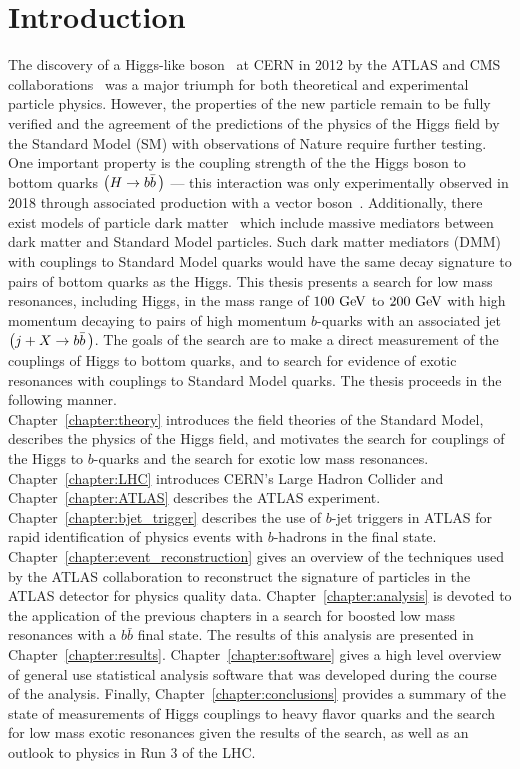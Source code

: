 \chapter{Introduction}\label{chapter:introduction}

The discovery of a Higgs-like boson~\cite{Higgs:1964ia,Higgs:1964pj,Higgs:1966ev,Englert:1964et,Guralnik:1964eu} at CERN in 2012 by the \Gls{ATLAS} and CMS collaborations~\cite{Aad:2012tfa,Chatrchyan:2012xdj} was a major triumph for both theoretical and experimental particle physics.
However, the properties of the new particle remain to be fully verified and the agreement of the predictions of the physics of the Higgs field by the \Gls{Standard Model} (SM) with observations of Nature require further testing.
One important property is the coupling strength of the the Higgs boson to bottom quarks $\left(H \to b\bar{b}\,\right)$ --- this interaction was only experimentally observed in 2018 through associated production with a vector boson~\cite{Aaboud:2018zhk,CMS:2018abb}.
Additionally, there exist models of particle dark matter~\cite{Abdallah:2015ter} which include massive mediators between dark matter and Standard Model particles.
Such \gls{dark matter mediator}s (DMM) with couplings to Standard Model quarks would have the same decay signature to pairs of bottom quarks as the Higgs.
This thesis presents a search for low mass resonances, including Higgs, in the mass range of $100~\mathrm{GeV}$ to $200~\mathrm{GeV}$ with high momentum decaying to pairs of high momentum $b$-quarks with an associated jet $\left(j + X \to b\bar{b}\,\right)$.
The goals of the search are to make a direct measurement of the couplings of Higgs to bottom quarks, and to search for evidence of exotic resonances with couplings to Standard Model quarks.
The thesis proceeds in the following manner.\\

Chapter~\ref{chapter:theory} introduces the field theories of the Standard Model, describes the physics of the Higgs field, and motivates the search for couplings of the Higgs to $b$-quarks and the search for exotic low mass resonances.
Chapter~\ref{chapter:LHC} introduces CERN's Large Hadron Collider and Chapter~\ref{chapter:ATLAS} describes the ATLAS experiment.
Chapter~\ref{chapter:bjet_trigger} describes the use of $b$-jet triggers in ATLAS for rapid identification of physics events with $b$-hadrons in the final state.
Chapter~\ref{chapter:event_reconstruction} gives an overview of the techniques used by the ATLAS collaboration to reconstruct the signature of particles in the ATLAS detector for physics quality data.
Chapter~\ref{chapter:analysis} is devoted to the application of the previous chapters in a search for boosted low mass resonances with a $b\bar{b}$ final state.
The results of this analysis are presented in Chapter~\ref{chapter:results}.
Chapter~\ref{chapter:software} gives a high level overview of general use statistical analysis software that was developed during the course of the analysis.
Finally, Chapter~\ref{chapter:conclusions} provides a summary of the state of measurements of Higgs couplings to heavy flavor quarks and the search for low mass exotic resonances given the results of the search, as well as an outlook to physics in Run 3 of the LHC.
